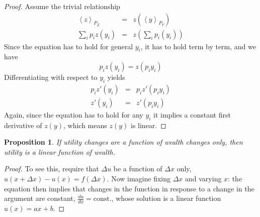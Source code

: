 \documentclass[final]{ectaart}
\newcommand{\ave}[1]{\left\langle#1 \right\rangle}
\newcommand{\be}{\begin{equation}}
\newcommand{\ee}{\end{equation}}
\newcommand{\bea}{\begin{eqnarray}}
\newcommand{\eea}{\end{eqnarray}}
\newcommand{\Dx}{{\Delta x}}
\newcommand{\Du}{\Delta u}
\theoremstyle{plain}
\newtheorem{prop}[thm]{Proposition}
\begin{document}
\begin{proof}
Assume the trivial relationship
\bea
\ave{z}_{P_Z}&=&z\left(\ave{y}_{P_Y}\right)\\
\sum_{i}p_i z(y_i) &=& z\left(\sum_{i}p_i(y_i) \right)
\eea
Since the equation has to hold for general $y_i$, it has to hold term by term, and we have
\be
p_i z(y_i) = z (p_i y_i)
\ee
Differentiating with respect to $y_i$ yields
\bea
p_i z'(y_i) &=& p_i z' (p_i y_i)\\
z'(y_i) &=& z' (p_i y_i)
\eea
Again, since the equation has to hold for any $y_i$ it implies a constant first derivative of $z(y)$, which means $z(y)$ is linear.
\end{proof}

\begin{prop}
If utility changes are a function of wealth changes only, then utility is a linear function of wealth.
\end{prop}
\begin{proof}
To see this, require that $\Du$ be a function of $\Dx$ only, $u(x+\Dx)-u(x)=f(\Dx)$. Now imagine fixing $\Dx$ and varying $x$: the equation then implies that changes in the function in response to a change in the argument are constant, $\frac{du}{dx}=\text{const.}$, whose solution is a linear function $u(x)=ax+b$.
\end{proof}
\end{document}
